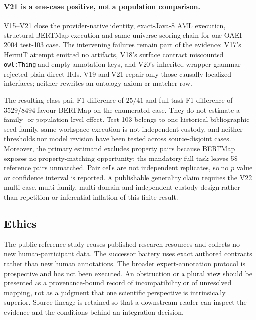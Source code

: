 \paragraph{V21 is a one-case positive, not a population comparison.}
V15--V21 close the provider-native identity, exact-Java-8 AML execution,
structural BERTMap execution and same-universe scoring chain for one OAEI 2004
test-103 case. The intervening failures remain part of the evidence: V17's
HermiT attempt emitted no artifacts, V18's surface contract miscounted
\texttt{owl:Thing} and empty annotation keys, and V20's inherited wrapper
grammar rejected plain direct IRIs. V19 and V21 repair only those causally
localized interfaces; neither rewrites an ontology axiom or matcher row.

The resulting class-pair F1 difference of $25/41$ and full-task F1 difference
of $3529/8494$ favour BERTMap on the enumerated case. They do not estimate a
family- or population-level effect. Test 103 belongs to one historical
bibliographic seed family, same-workspace execution is not independent
custody, and neither thresholds nor model revision have been tested across
source-disjoint cases. Moreover, the primary estimand excludes property pairs
because BERTMap exposes no property-matching opportunity; the mandatory full
task leaves 58 reference pairs unmatched. Pair cells are not independent
replicates, so no $p$ value or confidence interval is reported. A publishable
generality claim requires the V22 multi-case, multi-family, multi-domain and
independent-custody design rather than repetition or inferential inflation of
this finite result.

\subsection{Ethics}

The public-reference study reuses published research resources and collects no
new human-participant data. The successor battery uses exact authored
contracts rather than new human annotations. The broader expert-annotation
protocol is prospective and has not been executed. An obstruction or a plural
view should be presented as a provenance-bound record of incompatibility or of
unresolved mapping, not as a judgment that one scientific perspective is
intrinsically superior. Source lineage is retained so that a downstream reader
can inspect the evidence and the conditions behind an integration decision.

\endinput
